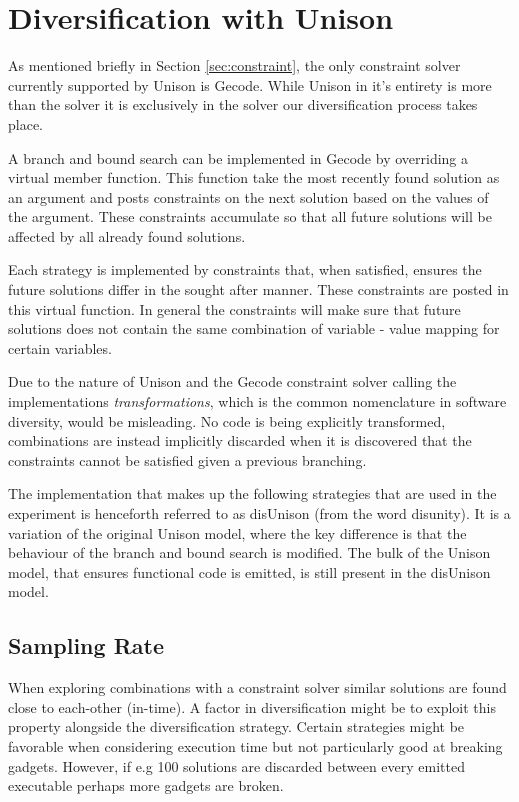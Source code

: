 \chapter{Diversification with Unison}

As mentioned briefly in Section \ref{sec:constraint}, the only constraint solver currently
supported by Unison is Gecode. While Unison in it's entirety is more than the solver it is
exclusively in the solver our diversification process takes place.

A branch and bound search can be implemented in Gecode by overriding a virtual member
function. This function take the most recently found solution as an argument and posts
constraints on the next solution based on the values of the argument. These constraints
accumulate so that all future solutions will be affected by all already found solutions.

Each strategy is implemented by constraints that, when satisfied, ensures the
future solutions differ in the sought after manner. These constraints are posted in this
virtual function. In general the constraints will make sure that future solutions does not
contain the same combination of variable - value mapping for certain variables.

Due to the nature of Unison and the Gecode constraint solver calling the implementations
\textit{transformations}, which is the common nomenclature in software diversity, would be
misleading. No code is being explicitly transformed, combinations are instead implicitly
discarded when it is discovered that the constraints cannot be satisfied given a previous
branching.

The implementation that makes up the following strategies that are used in the experiment
is henceforth referred to as disUnison (from the word disunity). It is a variation of the
original Unison model, where the key difference is that the behaviour of the branch and
bound search is modified. The bulk of the Unison model, that ensures functional code is
emitted, is still present in the disUnison model.



\section{Sampling Rate}
\label{sec:sampling_rate}

When exploring combinations with a constraint solver similar solutions are found close to
each-other (in-time). A factor in diversification might be to exploit this property
alongside the diversification strategy. Certain strategies might be favorable when
considering execution time but not particularly good at breaking gadgets. However, if
e.g 100 solutions are discarded between every emitted executable perhaps more gadgets are
broken.

